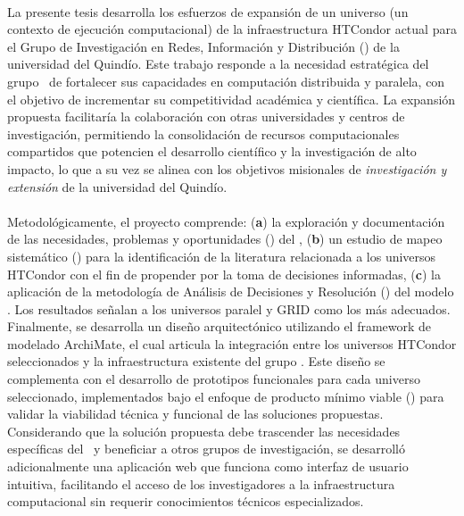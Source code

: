 \label{cap:resumen}
\mbox{}\\

La presente tesis desarrolla los esfuerzos de expansión de un universo (\ie un contexto de ejecución computacional) de la infraestructura HTCondor actual para el Grupo de Investigación en Redes, Información y Distribución (\GRID) de la universidad del Quindío. Este trabajo responde a la necesidad estratégica del grupo \GRID~de fortalecer sus capacidades en computación distribuida y paralela, con el objetivo de incrementar su competitividad académica y científica. La expansión propuesta facilitaría la colaboración con otras universidades y centros de investigación, permitiendo la consolidación de recursos computacionales compartidos que potencien el desarrollo científico y la investigación de alto impacto, lo que a su vez se alinea con los objetivos misionales de \textit{investigación y extensión} de la universidad del Quindío.
\\\\
Metodológicamente, el proyecto comprende: (\textbf{a}) la exploración y documentación de las necesidades, problemas y oportunidades (\NPO) del \GRID, (\textbf{b}) un estudio de mapeo sistemático (\SMS) para la identificación de la literatura relacionada a los universos HTCondor con el fin de propender por la toma de decisiones informadas, (\textbf{c}) la aplicación de la metodología de Análisis de Decisiones y Resolución (\DAR) del modelo \CMMI. Los resultados señalan a los universos paralel y GRID como los más adecuados. Finalmente, se desarrolla un diseño arquitectónico utilizando el framework de modelado ArchiMate, el cual articula la integración entre los universos HTCondor seleccionados y la infraestructura existente del grupo \GRID. Este diseño se complementa con el desarrollo de prototipos funcionales para cada universo seleccionado, implementados bajo el enfoque de producto mínimo viable (\PMV) para validar la viabilidad técnica y funcional de las soluciones propuestas. Considerando que la solución propuesta debe trascender las necesidades específicas del \GRID~y beneficiar a otros grupos de investigación, se desarrolló adicionalmente una aplicación web que funciona como interfaz de usuario intuitiva, facilitando el acceso de los investigadores a la infraestructura computacional sin requerir conocimientos técnicos especializados.






\label{cap:abstract}
\mbox{}\\

